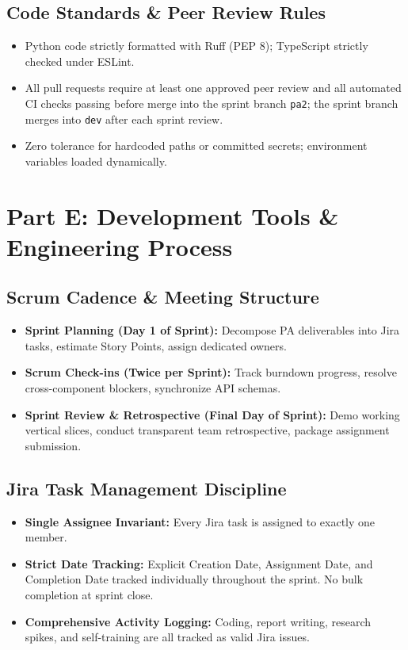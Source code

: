 \documentclass[11pt,a4paper]{article}
\begin{document}
\subsection{Code Standards \& Peer Review Rules}
\begin{itemize}[leftmargin=1.2cm]
    \item Python code strictly formatted with Ruff (PEP 8); TypeScript strictly checked under ESLint.
    \item All pull requests require at least one approved peer review and all automated CI checks passing before merge into the sprint branch \texttt{pa2}; the sprint branch merges into \texttt{dev} after each sprint review.
    \item Zero tolerance for hardcoded paths or committed secrets; environment variables loaded dynamically.
\end{itemize}

\newpage

\section{Part E: Development Tools \& Engineering Process}
\subsection{Scrum Cadence \& Meeting Structure}
\begin{itemize}[leftmargin=1.2cm]
    \item \textbf{Sprint Planning (Day 1 of Sprint):} Decompose PA deliverables into Jira tasks, estimate Story Points, assign dedicated owners.
    \item \textbf{Scrum Check-ins (Twice per Sprint):} Track burndown progress, resolve cross-component blockers, synchronize API schemas.
    \item \textbf{Sprint Review \& Retrospective (Final Day of Sprint):} Demo working vertical slices, conduct transparent team retrospective, package assignment submission.
\end{itemize}

\subsection{Jira Task Management Discipline}
\begin{itemize}[leftmargin=1.2cm]
    \item \textbf{Single Assignee Invariant:} Every Jira task is assigned to exactly one member.
    \item \textbf{Strict Date Tracking:} Explicit Creation Date, Assignment Date, and Completion Date tracked individually throughout the sprint. No bulk completion at sprint close.
    \item \textbf{Comprehensive Activity Logging:} Coding, report writing, research spikes, and self-training are all tracked as valid Jira issues.
\end{itemize}
\end{document}
